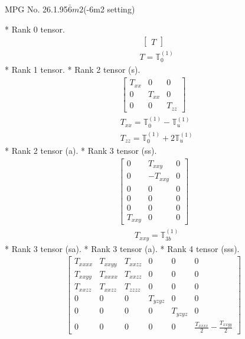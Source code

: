\documentclass[fleqn,8pt,landscape]{jsarticle}
\begin{document}
\setcounter{MaxMatrixCols}{32}

\renewcommand{\tablename}{Table~}
\renewcommand{\figurename}{Figure~}
\begin{center}
\LARGE
MPG No. 26.1.95\quad$\bar{6}m2$\quad(-6m2 setting)
\end{center}
* Rank 0 tensor.
\begin{align*}
\begin{bmatrix} T \end{bmatrix}
\end{align*}
\begin{align*}
& T = \mathbb{T}_{0}^{(1)}
\end{align*}
* Rank 1 tensor.
* Rank 2 tensor (s).
\begin{align*}
\begin{bmatrix} T_{xx} & 0 & 0 \\ 0 & T_{xx} & 0 \\ 0 & 0 & T_{zz} \end{bmatrix}
\end{align*}
\begin{align*}
& T_{xx} = \mathbb{T}_{0}^{(1)} - \mathbb{T}_{u}^{(1)} \\
& T_{zz} = \mathbb{T}_{0}^{(1)} + 2 \mathbb{T}_{u}^{(1)}
\end{align*}
* Rank 2 tensor (a).
* Rank 3 tensor (ss).
\begin{align*}
\begin{bmatrix} 0 & T_{xxy} & 0 \\ 0 & - T_{xxy} & 0 \\ 0 & 0 & 0 \\ 0 & 0 & 0 \\ 0 & 0 & 0 \\ T_{xxy} & 0 & 0 \end{bmatrix}
\end{align*}
\begin{align*}
& T_{xxy} = \mathbb{T}_{3b}^{(1)}
\end{align*}
* Rank 3 tensor (sa).
* Rank 3 tensor (a).
* Rank 4 tensor (sss).
\begin{align*}
\begin{bmatrix} T_{xxxx} & T_{xxyy} & T_{xxzz} & 0 & 0 & 0 \\ T_{xxyy} & T_{xxxx} & T_{xxzz} & 0 & 0 & 0 \\ T_{xxzz} & T_{xxzz} & T_{zzzz} & 0 & 0 & 0 \\ 0 & 0 & 0 & T_{yzyz} & 0 & 0 \\ 0 & 0 & 0 & 0 & T_{yzyz} & 0 \\ 0 & 0 & 0 & 0 & 0 & \frac{T_{xxxx}}{2} - \frac{T_{xxyy}}{2} \end{bmatrix}
\end{align*}
\end{document}
